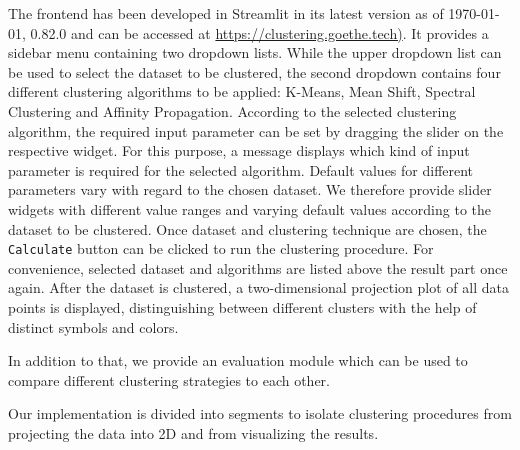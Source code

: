 The frontend has been developed in Streamlit \cite{streamlit2018} in its latest version as of \today, 0.82.0 and can be accessed at \url{https://clustering.goethe.tech)}.
It provides a sidebar menu containing two dropdown lists. While the upper dropdown list can be used to select the dataset to be clustered, the second dropdown contains four different clustering algorithms to be applied: K-Means, Mean Shift, Spectral Clustering and Affinity Propagation. According to the selected clustering algorithm, the required input parameter can be set by dragging the slider on the respective widget. For this purpose, a message displays which kind of input parameter is required for the selected algorithm. 
Default values for different parameters vary with regard to the chosen dataset. We therefore provide slider widgets with different value ranges and varying default values according to the dataset to be clustered.
Once dataset and clustering technique are chosen, the \texttt{Calculate} button can be clicked to run the clustering procedure.
For convenience, selected dataset and algorithms are listed above the result part once again. After the dataset is clustered, a two-dimensional projection plot of all data points is displayed, distinguishing between different clusters with the help of distinct symbols and colors. 

In addition to that, we provide an evaluation module which can be used to compare different clustering strategies to each other. 

Our implementation is divided into segments to isolate clustering procedures from projecting the data into 2D and from visualizing the results.

